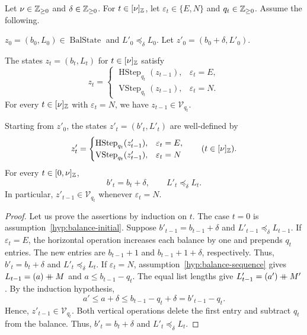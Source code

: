\begin{lemma}\label{lem:balance-list-comparison}
Let $\nu\in\mathbb Z_{\ge0}$ and $\delta\in\mathbb Z_{\ge0}$.
For $t\in[\nu]_{\mathbb Z}$, let $\varepsilon_t\in\{E,N\}$ and $q_t\in\mathbb Z_{\ge0}$.
Assume the following.
\begin{hypotheses}
\item\label{hyp:balance-initial} $z_0=(b_0,L_0)\in\operatorname{BalState}$ and $L'_0\preceq_\delta L_0$.
Let $z'_0=(b_0+\delta,L'_0)$.
\item\label{hyp:balance-sequence} The states $z_t=(b_t,L_t)$ for $t\in[\nu]_{\mathbb Z}$ satisfy
\[
 z_t=\begin{cases}
 \operatorname{HStep}_{q_t}(z_{t-1}),&\varepsilon_t=E,\\
 \operatorname{VStep}_{q_t}(z_{t-1}),&\varepsilon_t=N.
 \end{cases}
\]
For every $t\in[\nu]_{\mathbb Z}$ with $\varepsilon_t=N$, we have $z_{t-1}\in\mathcal V_{q_t}$.
\end{hypotheses}
Starting from $z'_0$, the states $z'_t=(b'_t,L'_t)$ are well-defined by
\[
 z'_t=\begin{cases}
 \operatorname{HStep}_{q_t}(z'_{t-1}),&\varepsilon_t=E,\\
 \operatorname{VStep}_{q_t}(z'_{t-1}),&\varepsilon_t=N
 \end{cases}
 \qquad(t\in[\nu]_{\mathbb Z}).
\]
For every $t\in[0,\nu]_{\mathbb Z}$,
\[
 b'_t=b_t+\delta,\qquad L'_t\preceq_\delta L_t.
\]
In particular, $z'_{t-1}\in\mathcal V_{q_t}$ whenever $\varepsilon_t=N$.
\end{lemma}
\begin{proof}
Let us prove the assertions by induction on $t$.
The case $t=0$ is assumption~\ref{hyp:balance-initial}.
Suppose $b'_{t-1}=b_{t-1}+\delta$ and $L'_{t-1}\preceq_\delta L_{t-1}$.
If $\varepsilon_t=E$, the horizontal operation increases each balance by one and prepends $q_t$ entries.
The new entries are $b_{t-1}+1$ and $b_{t-1}+1+\delta$, respectively.
Thus, $b'_t=b_t+\delta$ and $L'_t\preceq_\delta L_t$.
If $\varepsilon_t=N$, assumption~\ref{hyp:balance-sequence} gives
$L_{t-1}=(a)\mathbin{+\mkern-10mu+} M$ and $a\le b_{t-1}-q_t$.
The equal list lengths give $L'_{t-1}=(a')\mathbin{+\mkern-10mu+} M'$.
By the induction hypothesis,
\[
 a'\le a+\delta\le b_{t-1}-q_t+\delta=b'_{t-1}-q_t.
\]
Hence, $z'_{t-1}\in\mathcal V_{q_t}$.
Both vertical operations delete the first entry and subtract $q_t$ from the balance.
Thus, $b'_t=b_t+\delta$ and $L'_t\preceq_\delta L_t$.
\end{proof}

